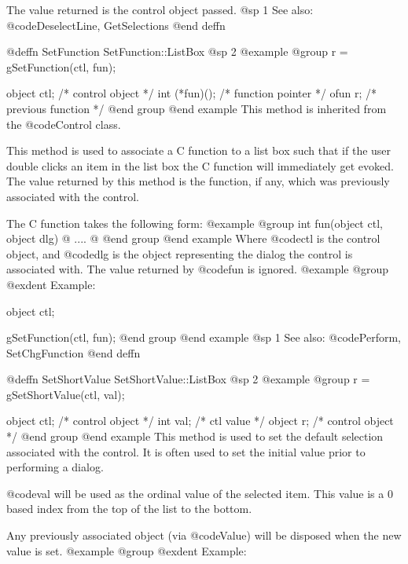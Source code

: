 {The value returned is the control object passed.
@sp 1
See also:  @code{DeselectLine, GetSelections}
@end deffn








@deffn {SetFunction} SetFunction::ListBox
@sp 2
@example
@group
r = gSetFunction(ctl, fun);

object  ctl;      /*  control object           */
int     (*fun)(); /*  function pointer         */
ofun    r;        /*  previous function        */
@end group
@end example
This method is inherited from the @code{Control} class.

This method is used to associate a C function to a list box such that if
the user double clicks an item in the list box the C function will
immediately get evoked.  The value returned by this method is the
function, if any, which was previously associated with the control.

The C function takes the following form:
@example
@group
int     fun(object ctl, object dlg)
@{
        ....
@}
@end group
@end example
Where @code{ctl} is the control object, and @code{dlg} is the object
representing the dialog the control is associated with.  The value
returned by @code{fun} is ignored.
@example
@group
@exdent Example:

object  ctl;

gSetFunction(ctl, fun);
@end group
@end example
@sp 1
See also:  @code{Perform, SetChgFunction}
@end deffn


















@deffn {SetShortValue} SetShortValue::ListBox
@sp 2
@example
@group
r = gSetShortValue(ctl, val);

object  ctl;    /*  control object  */
int     val;    /*  ctl value       */
object  r;      /*  control object  */
@end group
@end example
This method is used to set the default selection associated with the
control.  It is often used to set the initial value prior to performing
a dialog.

@code{val} will be used as the ordinal value of the selected item.  This
value is a 0 based index from the top of the list to the bottom.

Any previously associated object (via @code{Value}) will be disposed
when the new value is set.
@example
@group
@exdent Example:

}
